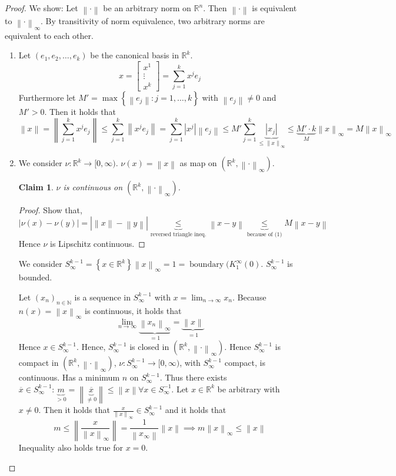 \documentclass{article}
\newtheorem*{claim}{Claim}%
\newcommand{\set}[1]{\left\{#1\right\}}
\newcommand{\norm}[1]{\left\|#1\right\|}
\newcommand{\card}[1]{\left|#1\right|}
\begin{document}
\begin{proof}
  We show: Let $\norm{\cdot}$ be an arbitrary norm on $\mathbb R^n$. Then $\norm{\cdot}$ is equivalent to $\norm{\cdot}_{\infty}$. By transitivity of norm equivalence, two arbitrary norms are equivalent to each other.
  \begin{enumerate}
    \item Let $(e_1, e_2, \dots, e_k)$ be the canonical basis in $\mathbb R^k$.
      \[ x = \begin{bmatrix} x^1 \\ \vdots \\ x^k \end{bmatrix} = \sum_{j=1}^k x^j e_j \]
      Furthermore let $M' = \max\set{\norm{e_j}: j = 1, \dots, k}$ with $\norm{e_j} \neq 0$ and $M' > 0$.
      Then it holds that
      \[ \norm{x} = \norm{\sum_{j=1}^k x^j e_j} \leq \sum_{j=1}^k \norm{x^j e_j} = \sum_{j=1}^k \card{x^j} \norm{e_j} \leq M' \sum_{j=1}^k \underbrace{\card{x_j}}_{\leq \norm{x}_\infty} \leq \underbrace{M' \cdot k}_{M} \norm{x}_{\infty} = M \norm{x}_\infty \]
    \item
      We consider $\nu: \mathbb R^k \to [0, \infty)$.
      $\nu(x) = \norm{x}$ as map on $(\mathbb R^k, \norm{\cdot}_{\infty})$.

      \begin{claim}
        $\nu$ is continuous on $(\mathbb R^k, \norm{\cdot}_{\infty})$.
      \end{claim}
      \begin{proof}
        Show that,
        \[ \card{\nu(x) - \nu(y)} = \card{\norm{x} - \norm{y}} \underbrace{\leq}_{\text{reversed triangle ineq.}} \norm{x - y} \underbrace{\leq}_{\text{because of (1)}} M \norm{x - y} \]
        Hence $\nu$ is Lipschitz continuous.
      \end{proof}

      We consider $S_{\infty}^{k-1} = \set{x \in \mathbb R^k}{\norm{x}_{\infty} = 1} = \operatorname{boundary}(K_1^\infty(0)$.
      $S_{\infty}^{k-1}$ is bounded.

      Let $(x_n)_{n \in \mathbb N}$ is a sequence in $S_{\infty}^{k-1}$ with $x = \lim_{n\to\infty} x_n$. Because $n(x) = \norm{x}_{\infty}$ is continuous, it holds that
      \[ \lim_{n\to\infty} \underbrace{\norm{x_n}_{\infty}}_{=1} = \underbrace{\norm{x}}_{=1} \]
      Hence $x \in S_{\infty}^{k-1}$. Hence, $S_{\infty}^{k-1}$ is closed in $(\mathbb R^k, \norm{\cdot}_{\infty})$.
      Hence $S_{\infty}^{k-1}$ is compact in $(\mathbb R^k, \norm{\cdot}_{\infty})$, $\nu: S_{\infty}^{k-1} \to [0, \infty)$, with $S_{\infty}^{k-1}$ compact, is continuous.
      Has a minimum $n$ on $S_{\infty}^{k-1}$. Thus there exists $\overline{x} \in S_{\infty}^{k-1}: \underbrace{m}_{> 0} = \norm{\underbrace{\overline{x}}_{\neq 0}} \leq \norm{x} \forall x \in S_{\infty}^{-1}$.
      Let $x \in \mathbb R^k$ be arbitrary with $x \neq 0$. Then it holds that $\frac{x}{\norm{x}_{\infty}} \in S_{\infty}^{k-1}$ and it holds that
      \[ m \leq \norm{\frac{x}{\norm{x}_{\infty}}} = \frac{1}{\norm{x_{\infty}}} \norm{x} \implies m \norm{x}_{\infty} \leq \norm{x} \]
      Inequality also holds true for $x = 0$.
  \end{enumerate}
\end{proof}
\end{document}
